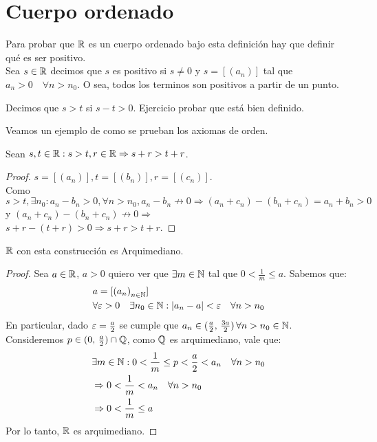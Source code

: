 \section{Cuerpo ordenado}

Para probar que \(\mathbb{R} \) es un cuerpo ordenado bajo esta definición hay que definir qué es ser positivo. \\
Sea \(s \in \mathbb{R} \) decimos que \(s\) es positivo si \(s \neq 0\) y \(s = [(a_n)]\) tal que \(a_n > 0 \quad \forall n > n_0\). O sea, todos los terminos son positivos a partir de un punto.

\begin{definition}
	Decimos que \(s > t\) si \(s-t > 0\).
	Ejercicio probar que está bien definido.
\end{definition}

Veamos un ejemplo de como se prueban los axiomas de orden.

\clearpage

\begin{theorem}
	Sean \(s, t \in \mathbb{R} : s > t, r \in \mathbb{R} \Rightarrow s+r > t+r\).
	\begin{proof}
		\(s = [(a_n)], t = [(b_n)], r = [(c_n)]\). \\
		Como \(s > t, \exists n_0 : a_n - b_n > 0, \forall n > n_0, a_n - b_n \not \to 0 \Rightarrow (a_n + c_n) - (b_n + c_n) = a_n + b_n > 0\) y \((a_n + c_n) - (b_n + c_n) \not \to 0 \Rightarrow \) \\
		\(s + r - (t + r) > 0 \Rightarrow s+r > t+r\).
	\end{proof}
\end{theorem}

\begin{theorem}
	\(\mathbb{R} \) con esta construcción es Arquimediano.
	\begin{proof}
		Sea \( a \in \mathbb{R} \), \( a > 0 \) quiero ver que \( \exists m \in \mathbb{N} \) tal que \( 0 < \frac{1}{m} \leq a \). Sabemos que:\begin{align*}
			 & a = [{(a_n)}_{n \in \mathbb{N}}]                                                       \\
			 & \forall \varepsilon > 0 \quad \exists n_0 \in \mathbb{N} : |a_n - a| < \varepsilon \quad \forall n > n_0
		\end{align*}
		En particular, dado \( \varepsilon = \frac{a}{2} \) se cumple que \( a_n \in (\frac{a}{2}\text{, } \frac{3a}{2}) \, \forall n > n_0 \in \mathbb{N} \). Consideremos \( p \in (0\text{, } \frac{a}{2}) \cap \mathbb{Q} \), como \( \mathbb{Q} \) es arquimediano,
		vale que: \begin{align*}
			 & \exists m \in \mathbb{N} : 0 < \frac{1}{m} \leq p < \frac{a}{2} < a_n \quad \forall n > n_0 \\
			 & \Rightarrow 0 < \frac{1}{m} < a_n \quad \forall n > n_0                             \\
			 & \Rightarrow 0 < \frac{1}{m} \leq a
		\end{align*}
		Por lo tanto, \( \mathbb{R} \) es arquimediano.
	\end{proof}
\end{theorem}

